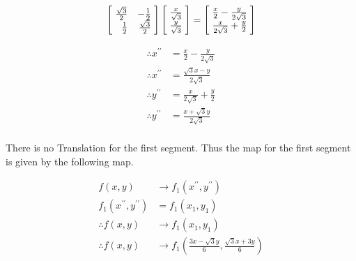 \documentclass[a4paper]{article}
\begin{document}
\begin{enumerate}[label=\textbf{\arabic*.}]
\begin{enumerate}
		\begin{equation*}
		\begin{bmatrix*}[r]
			\hspace{1mm} \frac{\sqrt{3}}{2} & -\frac{1}{2} \hspace{1mm}\\
			\hspace{1mm} \frac{1}{2} & \frac{\sqrt{3}}{2} \hspace{1mm}\\
		\end{bmatrix*}
		\begin{bmatrix*}[r]
			\hspace{1mm} \frac{x}{\sqrt{3}} \hspace{1mm}\\
			\hspace{1mm} \frac{y}{\sqrt{3}} \hspace{1mm}\\
		\end{bmatrix*}
		=
		\begin{bmatrix*}[r]
			\hspace{1mm} \frac{x}{2} - \frac{y}{2\sqrt{3}} \hspace{1mm}\\
			\hspace{1mm} \frac{x}{2\sqrt{3}} + \frac{y}{2} \hspace{1mm}\\
		\end{bmatrix*}
		\end{equation*}

		\begin{align*}
		\therefore x^{\prime \prime} & = \frac{x}{2} - \frac{y}{2\sqrt{3}}\\
		\therefore x^{\prime \prime} & = \frac{\sqrt{3}x-y}{2\sqrt{3}}\\
		\therefore y^{\prime \prime} & = \frac{x}{2\sqrt{3}} + \frac{y}{2}\\
		\therefore y^{\prime \prime} & = \frac{x + \sqrt{3}y}{2\sqrt{3}}\\
		\end{align*}

		There is no Translation for the first segment. Thus the map for the first segment is given by the following map.

		\begin{align*}
		f(x,y) & \rightarrow f_1(x^{\prime \prime},y^{\prime \prime})\\
		f_1(x^{\prime \prime},y^{\prime \prime})& = f_1(x_1,y_1)\\
		\therefore f(x,y) & \rightarrow f_1(x_1,y_1)\\
		\therefore f(x,y) & \rightarrow f_1\left(\frac{3x-\sqrt{3}y}{6},\frac{\sqrt{3}x + 3y}{6}\right)\\
		\end{align*}


\end{enumerate}
\end{enumerate}
\end{document}
